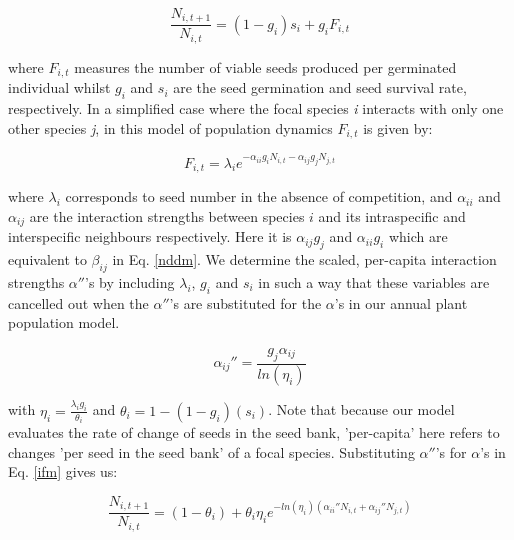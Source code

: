 \documentclass[a4,12pt]{article}
\begin{document}
\begin{itemize}
            \begin{equation}
                \frac{N_{i, t+1}}{N_{i, t}} = \left( 1 - g_{i} \right) s_{i} + g_{i}F_{i, t}
                \label{ifm}
            \end{equation}
        
        where \(F_{i,t}\) measures the number of viable seeds produced per germinated individual whilst \(g_{i}\) and \(s_{i}\) are the seed germination and seed survival rate, respectively. In a simplified case where the focal species \textit{i} interacts with only one other species \textit{j}, in this model of population dynamics \(F_{i,t}\) is given by:

            \begin{equation}
                F_{i,t} = \lambda_{i} e^{- \alpha_{ii} g_{i} N_{i, t} -  \alpha_{ij} g_{j} N_{j, t} }
                \label{fecundity}   
            \end{equation}

        where \(\lambda_{i}\) corresponds to seed number in the absence of competition, and \(\alpha_{ii}\) and \(\alpha_{ij}\) are the interaction strengths between species \(i\) and its intraspecific and interspecific neighbours respectively. Here it is \(\alpha_{ij} g_{j}\) and \(\alpha_{ii} g_{i}\) which are equivalent to \(\beta_{ij}\) in Eq. \ref{nddm}. 
        We determine the scaled, per-capita interaction strengths ${\alpha}''$'s by including \(\lambda_{i}\), \(g_{i}\) and \(s_{i}\) in such a way that these variables are cancelled out when the ${\alpha}''$'s are substituted for the $\alpha$'s in our annual plant population model. 

        \begin{equation}
            {\alpha_{ij}}'' = \frac{g_{j} \alpha_{ij}}{ln(\eta_{i})}
        \end{equation}

        with $\eta_{i} = \frac{\lambda_{i} g_{i}}{\theta_{i}}$ and $\theta_{i} = 1 - (1 - g_{i})(s_{i})$. %
        Note that because our model evaluates the rate of change of seeds in the seed bank, 'per-capita' here refers to changes 'per seed in the seed bank' of a focal species. Substituting ${\alpha}''$'s for $\alpha$'s in Eq. \ref{ifm} gives us: 
        
        \begin{equation}
            \frac{N_{i, t+1}}{N_{i, t}} = (1 - \theta_{i}) + \theta_{i} \eta_{i} e^{-ln(\eta_{i})({\alpha_{ii}}'' N_{i, t} + {\alpha_{ij}}'' N_{j, t})}
        \end{equation}


\end{itemize}
\end{document}
